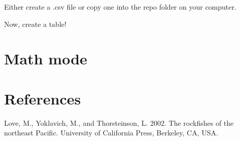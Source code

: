 \documentclass[12pt,]{article}
\begin{document}
Either create a .csv file or copy one into the repo folder on your
computer.

Now, create a table!

\section{Math mode}\label{math-mode}

\section*{References}\label{references}

\hypertarget{refs}{}
\hypertarget{ref-Love2002}{}
Love, M., Yoklavich, M., and Thorsteinson, L. 2002. The rockfishes of
the northeast Pacific. University of California Press, Berkeley, CA,
USA.
\end{document}
